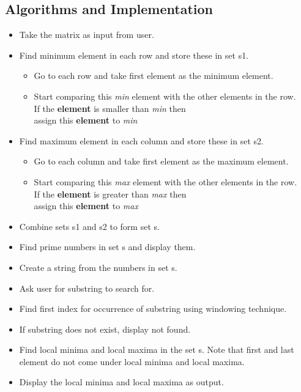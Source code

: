 \documentclass[12pt,a4paper]{article}
\begin{document}
        \subsection{Algorithms and Implementation}
            \begin{itemize}
                \item Take the matrix as input from user.
                \item Find minimum element in each row and store these in set s1.
                    \begin{itemize}
                        \item Go to each row and take first element as the minimum element.
                        \item Start comparing this \textit{min} element with the other elements in the row.\\
                            If the \textbf{element} is smaller than \textit{min} then\\
                                assign this \textbf{element} to \textit{min}
                    \end{itemize}
                \item Find maximum element in each column and store these in set s2.
                    \begin{itemize}
                        \item Go to each column and take first element as the maximum element.
                        \item Start comparing this \textit{max} element with the other elements in the row.\\
                        If the \textbf{element} is greater than \textit{max} then\\
                                assign this \textbf{element} to \textit{max}
                    \end{itemize}
                \item Combine sets s1 and s2 to form set s.
                \item Find prime numbers in set s and display them.
                \item Create a string from the numbers in set s.
                \item Ask user for substring to search for.
                \item Find first index for occurrence of substring using windowing technique.
                \item If substring does not exist, display not found.
                \item Find local minima and local maxima in the set s. Note that first and last element do not come under local minima and local maxima.
                \item Display the local minima and local maxima as output.
            \end{itemize}
\end{document}
